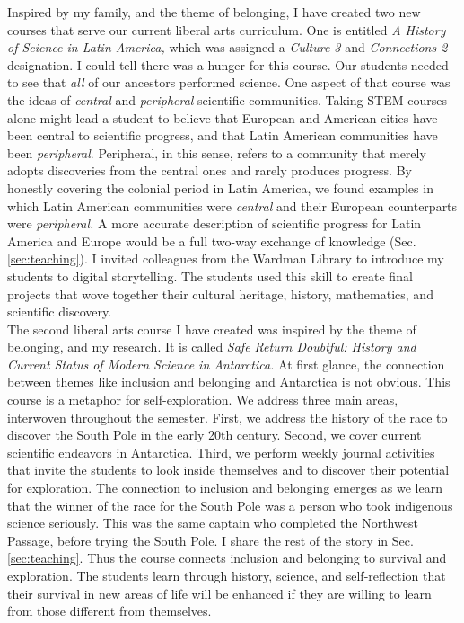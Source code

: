 \documentclass[../../main.tex]{subfiles}
\begin{document}
Inspired by my family, and the theme of belonging, I have created two new courses that serve our current liberal arts curriculum.  One is entitled \textit{A History of Science in Latin America,} which was assigned a \textit{Culture 3} and \textit{Connections 2} designation.  I could tell there was a hunger for this course.  Our students needed to see that \textit{all} of our ancestors performed science.  One aspect of that course was the ideas of \textit{central} and \textit{peripheral} scientific communities.  Taking STEM courses alone might lead a student to believe that European and American cities have been central to scientific progress, and that Latin American communities have been \textit{peripheral}.  Peripheral, in this sense, refers to a community that merely adopts discoveries from the central ones and rarely produces progress.  By honestly covering the colonial period in Latin America, we found examples in which Latin American communities were \textit{central} and their European counterparts were \textit{peripheral.}  A more accurate description of scientific progress for Latin America and Europe would be a full two-way exchange of knowledge (Sec. \ref{sec:teaching}).  I invited colleagues from the Wardman Library to introduce my students to digital storytelling.  The students used this skill to create final projects that wove together their cultural heritage, history, mathematics, and scientific discovery.
\\
\vspace{0.25cm}
The second liberal arts course I have created was inspired by the theme of belonging, and my research.  It is called \textit{Safe Return Doubtful: History and Current Status of Modern Science in Antarctica.}  At first glance, the connection between themes like inclusion and belonging and Antarctica is not obvious.  This course is a metaphor for self-exploration.  We address three main areas, interwoven throughout the semester.  First, we address the history of the race to discover the South Pole in the early 20th century.  Second, we cover current scientific endeavors in Antarctica.  Third, we perform weekly journal activities that invite the students to look inside themselves and to discover their potential for exploration.  The connection to inclusion and belonging emerges as we learn that the winner of the race for the South Pole was a person who took indigenous science seriously.  This was the same captain who completed the Northwest Passage, before trying the South Pole.  I share the rest of the story in Sec. \ref{sec:teaching}. Thus the course connects inclusion and belonging to survival and exploration.  The students learn through history, science, and self-reflection that their survival in new areas of life will be enhanced if they are willing to learn from those different from themselves.
\end{document}
